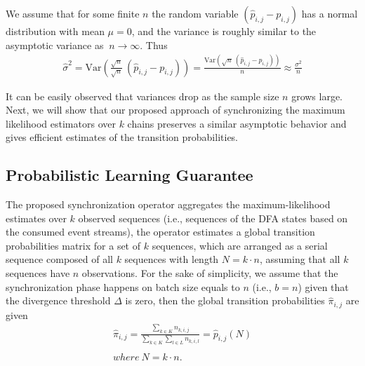 We assume that for some finite $n$ the random variable $(\hat{p}_{i,j} - {p}_{i,j})$ has a normal distribution with mean $\mu=0$, and the variance is roughly similar to the asymptotic variance  as $\ n \xrightarrow{} \infty$. Thus 
\begin{equation}
\begin{aligned}
\label{eq:var_isol}
	\widehat{\sigma}^{2} = \mathrm{Var} (\frac {\sqrt{n}}{\sqrt{n}}\  (\hat{p}_{i,j} - {p}_{i,j})) = \frac {\mathrm{Var}(\sqrt{n}\ (\hat{p}_{i,j} - {p}_{i,j}))}{n} \approx \frac {\sigma^{2}}{n}
\end{aligned}
\end{equation}

It can be easily observed that variances drop as the sample size $n$ grows large.  Next, we will show that our proposed approach of synchronizing the maximum likelihood estimators over $k$ chains preserves a similar asymptotic behavior and gives efficient estimates of the transition probabilities.


\subsection{Probabilistic Learning Guarantee}
\label{sec:guarantee}
\par The proposed synchronization operator aggregates the maximum-likelihood estimates over $k$ observed sequences (i.e., sequences of the DFA states based on the consumed event streams), the operator estimates a global transition probabilities matrix for a set of $k$ sequences, which are arranged as a serial sequence composed of all $k$ sequences with length $N=k \cdot n$, assuming that all $k$ sequences have $n$ observations. For the sake of simplicity, we assume that the synchronization phase happens on batch size equals to $n$ (i.e., $b=n$) given that the divergence threshold $\Delta$ is zero, then the global transition probabilities $\hat{\pi}_{i,j}$ are given 
\begin{equation}
\label{eq:dis_pi_estim2}
	\begin{aligned}
\hat{\pi}_{i,j}=\frac{\sum_{k \in K} n_{k,i,j}}{\sum_{k \in K} \sum_{l \in L} n_{k,i,l}} = \hat{p}_{i,j}(N)\\\\
 where\ N = k \cdot n.
 \end{aligned}
\end{equation}

